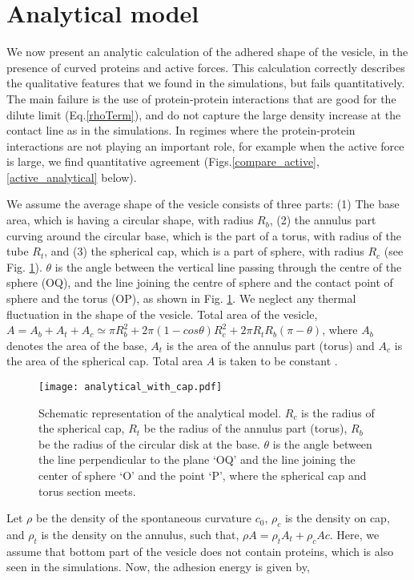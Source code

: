 \documentclass[pre,amsmath]{revtex4}
\begin{document}
\section{Analytical model}
\label{sec:analytical}
We now present an analytic calculation of the adhered shape of the vesicle, in the presence of curved proteins and active forces. This calculation correctly describes the qualitative features that we found in the simulations, but fails quantitatively. The main failure is the use of protein-protein interactions that are good for the dilute limit (Eq.\ref{rhoTerm}), and do not capture the large density increase at the contact line as in the simulations. In regimes where the protein-protein interactions are not playing an important role, for example when the active force is large, we find quantitative agreement (Figs.\ref{compare_active},\ref{active_analytical} below).

We assume the average shape of the vesicle consists of three parts: (1) The base area, which is having a circular shape, with radius $R_b$, (2) the annulus part curving around the circular base, which is the part of a torus, with radius of the tube $R_t$, and (3) the spherical cap, which is a part of sphere, with radius $R_c$ (see Fig. \ref{schematic}). $\theta$ is the angle between the vertical line passing through the centre of the sphere (OQ), and the line joining the centre of sphere and the contact point of sphere and the torus (OP), as shown in Fig. \ref{schematic}. We neglect any thermal fluctuation in the shape of the vesicle. Total area of the vesicle, $A= A_b + A_t + A_c \simeq \pi R_b^2 + 2 \pi (1-cos \theta) R_c^2 + 2 \pi R_t R_b (\pi - \theta ) $, where $A_b$ denotes the area of the base, $A_t$ is the area of the annulus part (torus) and $A_c$ is the area of the spherical cap. Total area $A$ is taken to be constant \cite{lipowski2005}. 
\begin{figure}[ht]
\centering
\texttt{[image: analytical\_with\_cap.pdf]}
\caption{Schematic representation of the analytical model. $R_c$ is the radius of the spherical cap, $R_t$ be the radius of the annulus part (torus), $R_b$ be the radius of the circular disk at the base. $\theta$ is the angle between  the line perpendicular to the plane `OQ' and the line joining the center of sphere `O' and the point `P', where the spherical cap and torus section meets.}
\label{schematic}
\end{figure}

Let $\rho $ be the density of the spontaneous curvature $c_0$, $\rho_c$ is the density on cap, and $\rho_t $ is the density on the annulus, such that, $\rho A = \rho_t A_t + \rho_c Ac$. Here, we assume that bottom part of the vesicle does not contain proteins, which is also seen in the simulations. Now, the adhesion energy is given by, 
\end{document}
